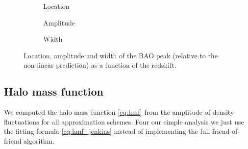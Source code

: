 \begin{figure}[tbp]
\newcommand{\corrwidth}{0.70}
\centering
	\begin{subfigure}{\corrwidth\textwidth}
	\end{subfigure}
	\begin{subfigure}{\corrwidth\textwidth}
		\centering
		\caption{Location}
	\end{subfigure}
	\begin{subfigure}{\corrwidth\textwidth}
		\centering
		\caption{Amplitude}
	\end{subfigure}
	\begin{subfigure}{\corrwidth\textwidth}
		\centering
		\caption{Width}
	\end{subfigure}
	\caption{Location, amplitude and width of the BAO peak (relative to the non-linear prediction) as a function of the redshift.}
	\label{fig:corr_peak}
\end{figure}

\subsection{Halo mass function}
We computed the halo mass function \eqref{eq:hmf} from the amplitude of density fluctuations for all approximation schemes. Four our simple analysis we just use the fitting formula \eqref{eq:hmf_jenkins} instead of implementing the full friend-of-friend algorithm.

